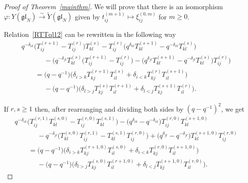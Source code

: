 \documentclass[11pt]{article}
\numberwithin{theorem}{section}
\numberwithin{proposition}{section}
\numberwithin{lemma}{section}
\numberwithin{corollary}{section}
\numberwithin{definition}{section}
\numberwithin{example}{section}
\numberwithin{remark}{section}
\numberwithin{note}{section}
\numberwithin{equation}{section}
\begin{document}
\begin{proof}[Proof of Theorem~\ref{mainthm}] We will prove that there is an isomorphism $\varphi\colon Y(\mathfrak{gl}_N)
\stackrel{\sim}{\longrightarrow} \widetilde{Y}(\mathfrak{gl}_N)$ given by $t_{ij}^{(m+1)} \mapsto
\xi_{ij}^{(0,m)}$ for $m\ge 0$.

Relation~\eqref{RTTql12} can be rewritten in the following way
\begin{gather*}
q^{-\delta_{ik}}\big(T_{ij}^{(r+1)} - T_{ij}^{(r)}\big) T_{kl}^{(s)}- T_{ij}^{(r)} \big(q^{\delta_{ik}}T_{kl}^{(s+1)}
- q^{-\delta_{ik}}T_{kl}^{(s)}\big)
\\
\qquad\phantom{=}{}
- \big(q^{-\delta_{jl}}T_{kl}^{(s)} \big(T_{ij}^{(r+1)} - T_{ij}^{(r)}\big) - \big(q^{\delta_{jl}}T_{kl}^{(s+1)} -
q^{-\delta_{jl}}T_{kl}^{(s)}\big) T_{ij}^{(r)} \big)
\\
\qquad
= \big(q-q^{-1}\big) \big(\delta_{i>k}T_{kj}^{(r+1)} T_{il}^{(s)} + \delta_{i<k} T_{kj}^{(r)} T_{il}^{(s+1)}\big)
\\
\qquad\phantom{=}{}
  - \big(q-q^{-1}\big) \big(\delta_{l>j} T_{kj}^{(s)} T_{il}^{(r+1)} + \delta_{l<j} T_{kj}^{(s+1)} T_{il}^{(r)} \big).
\end{gather*}

If $r,s \geq 1$ then, after rearranging and dividing both sides by $(q-q^{-1})^2$, we get
\begin{gather*}
q^{-\delta_{ik}} \big(T_{ij}^{(r,1)} T_{kl}^{(s,0)}- T_{ij}^{(r,0)} T_{kl}^{(s,1)} \big) - \big(q^{\delta_{ik}} -
q^{-\delta_{ik}}\big) T_{ij}^{(r,0)} T_{kl}^{(s+1,0)}
\\
\qquad\phantom{=}{}
 - q^{-\delta_{jl}} \big(T_{kl}^{(s,0)} T_{ij}^{(r,1)} - T_{kl}^{(s,1)} T_{ij}^{(r,0)} \big) + \big(q^{\delta_{jl}} -
q^{-\delta_{jl}}\big) T_{kl}^{(s+1,0)} T_{ij}^{(r,0)}
\\
\qquad
= \big(q-q^{-1}\big) \big(  \delta_{i>k} T_{kj}^{(r+1,0)} T_{il}^{(s,0)} + \delta_{i<k} T_{kj}^{(r,0)} T_{il}^{(s+1,0)}\big)
\\
\qquad\phantom{=}{}
  - \big(q-q^{-1}\big) \big(\delta_{l>j} T_{kj}^{(s,0)} T_{il}^{(r+1,0)} + \delta_{l<j} T_{kj}^{(s+1,0)} T_{il}^{(r,0)} \big).
\end{gather*}


\end{proof}
\end{document}
